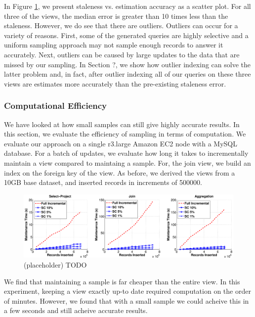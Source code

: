 In Figure \ref{exp3dist}, we present staleness vs. estimation accuracy as a scatter plot.
For all three of the views, the median error is greater than 10 times less than the staleness. 
However, we do see that there are outliers.
Outliers can occur for a variety of reasons.
First, some of the generated queries are highly selective and a uniform sampling approach may not sample enough records to answer it accurately.
Next, outliers can be caused by large updates to the data that are missed by our sampling.
In Section ?, we show how outlier indexing can solve the latter problem and, in fact, after outlier indexing all of our queries on these three views are estimates more accurately than the pre-existing staleness error.

\subsubsection{Computational Efficiency}
We have looked at how small samples can still give highly accurate results.
In this section, we evaluate the efficiency of sampling in terms of computation.
We evaluate our approach on a single r3.large Amazon EC2 node with a MySQL database.
For a batch of updates, we evaluate how long it takes to incrementally maintain a view compared to maintaing a sample.
For, the join view, we build an index on the foreign key of the view.
As before, we derived the views from a 10GB base dataset, and inserted records in increments of 500000.

\begin{figure}[ht!]
\label{exp3dist}
\centering
\includegraphics[width=\textwidth]{exp/exp4-efficiency-tpcd-skew.eps}
 \caption{(placeholder) TODO}
\end{figure}

We find that maintaining a sample is far cheaper than the entire view. In this experiment, keeping a view exactly up-to date required computation on the order of minutes.
However, we found that with a small sample we could acheive this in a few seconds and still acheive accurate results.

